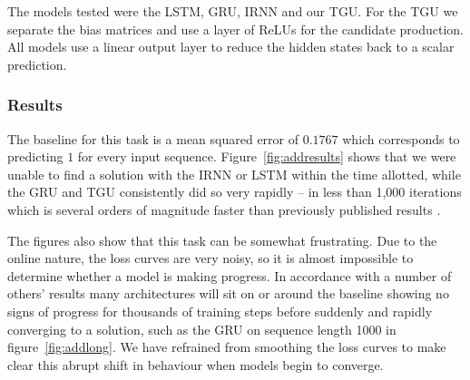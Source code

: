 The models tested were the LSTM, GRU, IRNN \autocite{Le2015} and our TGU. 
For the TGU we separate the bias matrices and use a layer of ReLUs for the candidate
production. All models use a linear output layer to reduce the hidden states back to a scalar prediction.

\subsubsection{Results}
The baseline for this task is a mean squared error of \(0.1767\) which corresponds to predicting
\(1\) for every input sequence.
Figure~\ref{fig:addresults} shows that we were unable to find a solution with the IRNN or LSTM within
the time allotted, while the GRU and TGU consistently did so very rapidly -- in less than 1,000
iterations which is several orders of magnitude faster than previously published results 
\autocite{Le2015, Arjovsky2015, Henaff2016}.

The figures also show that this task can be somewhat frustrating. Due to the online nature, the loss
curves are very noisy, so it is almost impossible to determine whether a model is making progress.
In accordance with a number of others' results \autocite{Le2015, Arjovsky2015} many
architectures will sit on or around the baseline showing no signs of progress for thousands of
training steps before suddenly and rapidly converging to a solution, such as
the GRU on sequence length 1000 in figure~\ref{fig:addlong}. 
We have refrained from smoothing the loss curves to make clear this abrupt shift in behaviour when models begin
to converge.

